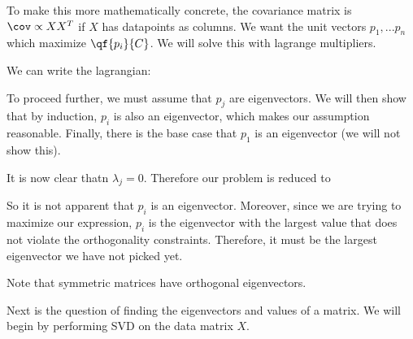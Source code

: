 \documentclass[12pt]{article}
\begin{document}
To make this more mathematically concrete, the covariance matrix is $\cov \propto XX^T$ if $X$ has datapoints as columns. We want the unit vectors $p_1, ... p_n$ which maximize $\qf{p_i}{C}$. We will solve this with lagrange multipliers.


We can write the lagrangian:



To proceed further, we must assume that $p_j$ are eigenvectors. We will then show that by induction, $p_i$ is also an eigenvector, which makes our assumption reasonable. Finally, there is the base case that $p_1$ is an eigenvector (we will not show this).


It is now clear thatn $\lambda_j = 0$. Therefore our problem is reduced to


So it is not apparent that $p_i$ is an eigenvector. Moreover, since we are trying to maximize our expression, $p_i$ is the eigenvector with the largest value that does not violate the orthogonality constraints. Therefore, it must be the largest eigenvector we have not picked yet.

Note that symmetric matrices have orthogonal eigenvectors. 

Next is the question of finding the eigenvectors and values of a matrix. We will begin by performing SVD on the data matrix $X$.
\end{document}
